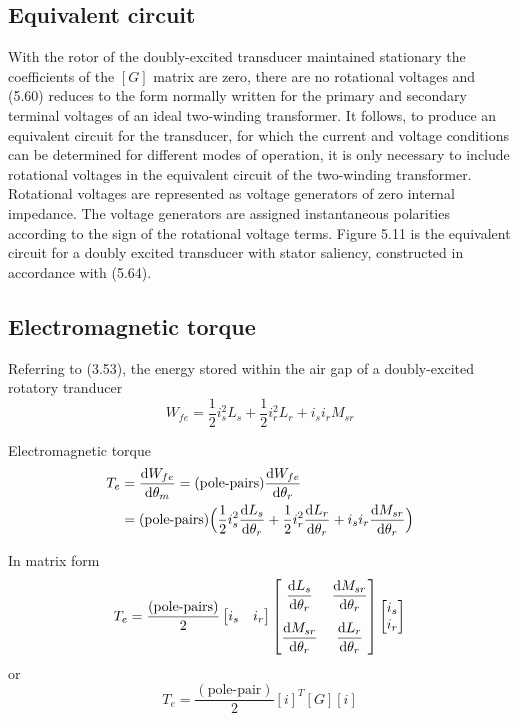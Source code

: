 \documentclass[a4paper,numbers=noenddot,12pt]{scrbook}
\begin{document}
    \subsection{Equivalent circuit} With the rotor of the doubly-excited transducer maintained stationary the coefficients of the $[G]$ matrix are zero, there are no rotational voltages and (5.60) reduces to the form normally written for the primary and secondary terminal voltages of an ideal two-winding transformer. It follows, to produce an equivalent circuit for the transducer, for which the current and voltage conditions can be determined for different modes of operation, it is only necessary to include rotational voltages in the equivalent circuit of the two-winding transformer. Rotational voltages are represented as voltage generators of zero internal impedance. The voltage generators are assigned instantaneous polarities according to the sign of the rotational voltage terms.
    Figure 5.11 is the equivalent circuit for a doubly excited transducer with stator saliency, constructed in accordance with (5.64).
    \subsection{Electromagnetic torque} Referring to (3.53), the energy stored within the air gap of a doubly-excited rotatory tranducer
    \begin{equation*}
        W_{fe} = \frac{1}{2} i_s^2 L_s + \frac{1}{2} i_r^2 L_r + i_s i_r M_{sr}
    \end{equation*}

    Electromagnetic torque
    \begin{align}
        T_e & = \frac{\dif W_{fe}}{\dif \theta_m} = (\text{pole-pairs}) \frac{\dif W_{fe}}{\dif \theta_r} \nonumber \\
        & = (\text{pole-pairs})\Big( \frac{1}{2}i_s^2 \frac{\dif L_s}{\dif \theta_r} + \frac{1}{2}i_r^2 \frac{\dif L_r}{\dif \theta_r}  +i_s i_r \frac{\dif M_{sr}}{\dif \theta_r}  \Big)
    \end{align}

    In matrix form
    \begin{equation}
        T_e = \frac{(\text{pole-pairs})}{2}
        \begin{bmatrix}
            i_s & i_r
        \end{bmatrix}
        \begin{bmatrix}
            \dfrac{\dif L_s}{\dif \theta_r} & \dfrac{\dif M_{sr}}{\dif \theta_r} \\[3ex] 
            \dfrac{\dif M_{sr}}{\dif \theta_r} & \dfrac{\dif L_{r}}{\dif \theta_r} 
        \end{bmatrix}
        \begin{bmatrix}
            i_s \\ i_r
        \end{bmatrix}
    \end{equation}
    or
    \begin{equation}
        T_e = \frac{(\text{pole-pair})}{2}{[i]}^T[G][i] %
    \end{equation}
\end{document}
